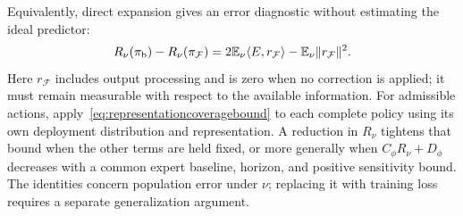 Equivalently, direct expansion gives an error diagnostic without estimating the ideal predictor:
\begin{equation}
 R_\nu(\pi_{\mathrm b})-R_\nu(\pi_{\mathcal F})
 =2\mathbb E_\nu\langle E,r_{\mathcal F}\rangle
  -\mathbb E_\nu\lVert r_{\mathcal F}\rVert^2.
 \label{eq:residualgain}
\end{equation}
Here $r_{\mathcal F}$ includes output processing and is zero when no correction is applied; it must remain measurable with respect to the available information.
For admissible actions, apply~\eqref{eq:representationcoveragebound} to each complete policy using its own deployment distribution and representation.
A reduction in $R_\nu$ tightens that bound when the other terms are held fixed, or more generally when $C_\phi R_\nu+D_\phi$ decreases with a common expert baseline, horizon, and positive sensitivity bound.
The identities concern population error under $\nu$; replacing it with training loss requires a separate generalization argument.
